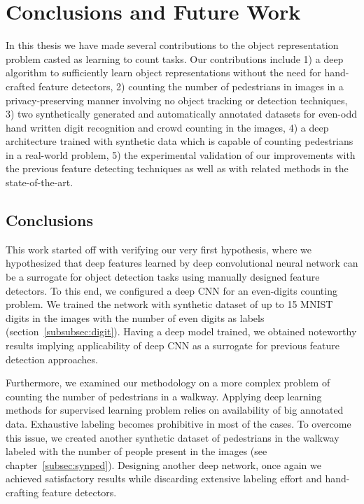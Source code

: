 \newpage

\chapter{Conclusions and Future Work}
\label{sec:conclusions}

\noindent In this thesis we have made several contributions to the object representation problem casted as learning to count tasks. Our contributions include 1) a deep algorithm to sufficiently learn object representations without the need for hand-crafted feature detectors, 2) counting the number of pedestrians in images in a privacy-preserving manner involving no object tracking or detection techniques, 3) two synthetically generated and automatically annotated datasets for even-odd hand written digit recognition and crowd counting in the images, 4) a deep architecture trained with synthetic data which is capable of counting pedestrians in a real-world problem, 5) the experimental validation of our improvements with the previous feature detecting techniques as well as with related methods in the state-of-the-art. 

\section{Conclusions}

This work started off with verifying our very first hypothesis, where we hypothesized that deep features learned by deep convolutional neural network can be a surrogate for object detection tasks using manually designed feature detectors. To this end, we configured a deep CNN for an even-digits counting problem. We trained the network with synthetic dataset of up to 15 MNIST digits in the images with the number of even digits as labels (section~\ref{subsubsec:digit}). Having a deep model trained, we obtained noteworthy results implying applicability of deep CNN as a surrogate for previous feature detection approaches.

\indent Furthermore, we examined our methodology on a more complex problem of counting the number of pedestrians in a walkway. Applying deep learning methods for supervised learning problem relies on availability of big annotated data. Exhaustive labeling becomes prohibitive in most of the cases. To overcome this issue, we created another synthetic dataset of pedestrians in the walkway labeled with the number of people present in the images (see chapter~\ref{subsec:synped}). Designing another deep network, once again we achieved satisfactory results while discarding extensive labeling effort and hand-crafting feature detectors.   

